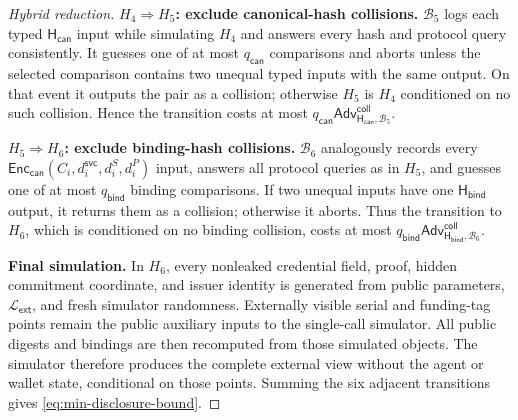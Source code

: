 \documentclass[letterpaper]{article}
\newcommand{\hash}{\mathsf{H}_{\mathsf{can}}}
\newcommand{\hashBind}{\mathsf{H}_{\mathsf{bind}}}
\newcommand{\Adv}{\mathsf{Adv}}
\begin{document}
\begin{proof}[Hybrid reduction]
\textbf{\(H_4\Rightarrow H_5\): exclude canonical-hash collisions.}
\(\mathcal B_5\) logs each typed \(\hash\) input while simulating \(H_4\) and
answers every hash and protocol query consistently. It guesses one of at most
\(q_{\mathsf{can}}\) comparisons and aborts unless the selected comparison
contains two unequal typed inputs with the same output. On that event it
outputs the pair as a collision; otherwise \(H_5\) is \(H_4\) conditioned on no
such collision. Hence the transition costs at most
\(q_{\mathsf{can}}\Adv^{\mathsf{coll}}_{\hash,\mathcal B_5}\).

\textbf{\(H_5\Rightarrow H_6\): exclude binding-hash collisions.}
\(\mathcal B_6\) analogously records every
\(\mathsf{Enc}_{\mathsf{can}}(C_i,d_i^{\mathsf{svc}},d_i^S,d_i^P)\) input,
answers all protocol queries as in \(H_5\), and guesses one of at most
\(q_{\mathsf{bind}}\) binding comparisons. If two unequal inputs have one
\(\hashBind\) output, it returns them as a collision; otherwise it aborts.
Thus the transition to \(H_6\), which is conditioned on no binding collision,
costs at most
\(q_{\mathsf{bind}}\Adv^{\mathsf{coll}}_{\hashBind,\mathcal B_6}\).

\textbf{Final simulation.}
In \(H_6\), every nonleaked credential field, proof, hidden commitment
coordinate, and issuer identity is generated from public parameters,
\(\mathcal L_{\mathsf{ext}}\), and fresh simulator randomness. Externally
visible serial and funding-tag points remain the public auxiliary inputs to the
single-call simulator.
All public digests and bindings are then recomputed from those simulated
objects. The simulator therefore produces the complete external view without
the agent or wallet state, conditional on those points. Summing the six
adjacent transitions gives
\cref{eq:min-disclosure-bound}.
\end{proof}
\end{document}
